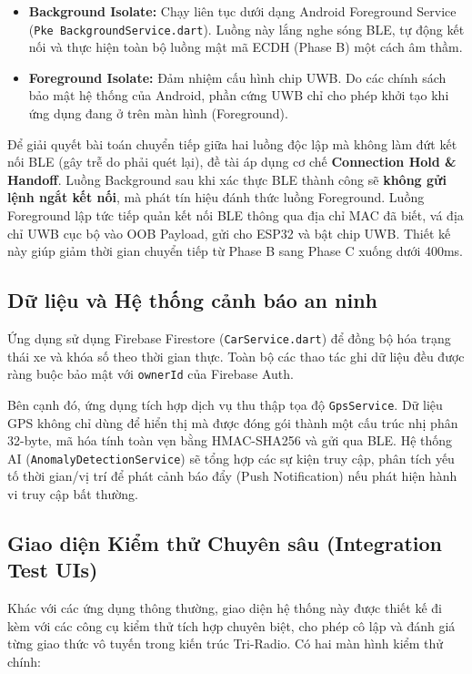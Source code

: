 \begin{itemize}
    \item \textbf{Background Isolate:} Chạy liên tục dưới dạng Android Foreground Service (\texttt{Pke BackgroundService.dart}). Luồng này lắng nghe sóng BLE, tự động kết nối và thực hiện toàn bộ luồng mật mã ECDH (Phase B) một cách âm thầm.
    \item \textbf{Foreground Isolate:} Đảm nhiệm cấu hình chip UWB. Do các chính sách bảo mật hệ thống của Android, phần cứng UWB chỉ cho phép khởi tạo khi ứng dụng đang ở trên màn hình (Foreground).
\end{itemize}

Để giải quyết bài toán chuyển tiếp giữa hai luồng độc lập mà không làm đứt kết nối BLE (gây trễ do phải quét lại), đề tài áp dụng cơ chế \textbf{Connection Hold \& Handoff}. Luồng Background sau khi xác thực BLE thành công sẽ \textbf{không gửi lệnh ngắt kết nối}, mà phát tín hiệu đánh thức luồng Foreground. Luồng Foreground lập tức tiếp quản kết nối BLE thông qua địa chỉ MAC đã biết, vá địa chỉ UWB cục bộ vào OOB Payload, gửi cho ESP32 và bật chip UWB. Thiết kế này giúp giảm thời gian chuyển tiếp từ Phase B sang Phase C xuống dưới 400ms.

\subsection{Dữ liệu và Hệ thống cảnh báo an ninh}
Ứng dụng sử dụng Firebase Firestore (\texttt{CarService.dart}) để đồng bộ hóa trạng thái xe và khóa số theo thời gian thực. Toàn bộ các thao tác ghi dữ liệu đều được ràng buộc bảo mật với \texttt{ownerId} của Firebase Auth.

Bên cạnh đó, ứng dụng tích hợp dịch vụ thu thập tọa độ \texttt{GpsService}. Dữ liệu GPS không chỉ dùng để hiển thị mà được đóng gói thành một cấu trúc nhị phân 32-byte, mã hóa tính toàn vẹn bằng HMAC-SHA256 và gửi qua BLE. Hệ thống AI (\texttt{AnomalyDetectionService}) sẽ tổng hợp các sự kiện truy cập, phân tích yếu tố thời gian/vị trí để phát cảnh báo đẩy (Push Notification) nếu phát hiện hành vi truy cập bất thường.

\subsection{Giao diện Kiểm thử Chuyên sâu (Integration Test UIs)}
Khác với các ứng dụng thông thường, giao diện hệ thống này được thiết kế đi kèm với các công cụ kiểm thử tích hợp chuyên biệt, cho phép cô lập và đánh giá từng giao thức vô tuyến trong kiến trúc Tri-Radio. Có hai màn hình kiểm thử chính:

